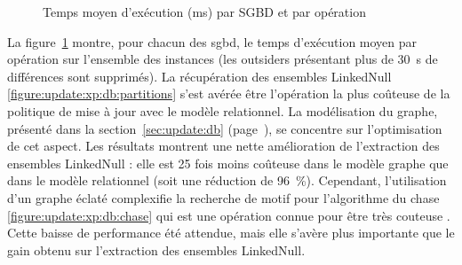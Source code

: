 \begin{figure}[htb]
    \centering
    \caption{Temps moyen d'exécution (\si{\ms}) par SGBD et par opération}
    \label{figure:update:xp:db}
\end{figure}

La figure~\ref{figure:update:xp:db} montre, pour chacun des \gls{sgbd}, le temps d'exécution moyen par opération sur l'ensemble des instances (les outsiders présentant plus de \SI{30}{\s} de différences sont supprimés).
La récupération des ensembles \textsf{LinkedNull} \ref{figure:update:xp:db:partitions} s'est avérée être l'opération la plus coûteuse de la politique de mise à jour avec le modèle relationnel.
La modélisation du graphe, présenté dans la section~\ref{sec:update:db} (page~\pageref{sec:update:db}), se concentre sur l'optimisation de cet aspect.
Les résultats montrent une nette amélioration de l'extraction des ensembles \textsf{LinkedNull} : elle est \num{25} fois moins coûteuse dans le modèle graphe que dans le modèle relationnel (soit une réduction de \SI{96}{\percent}).
Cependant, l'utilisation d'un graphe éclaté complexifie la recherche de motif pour l'algorithme du \gls{chase} \ref{figure:update:xp:db:chase} qui est une opération connue pour être très couteuse \cite{benediktBenchmarkingChase2017}.
Cette baisse de performance été attendue, mais elle s'avère plus importante que le gain obtenu sur l'extraction des ensembles \textsf{LinkedNull}.

